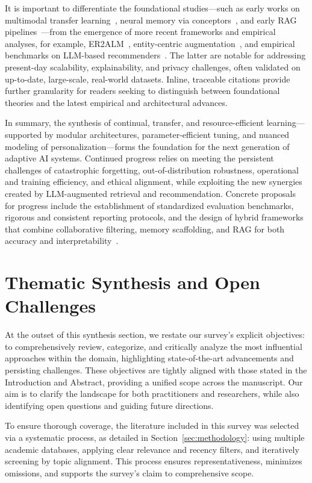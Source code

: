 \documentclass[sigconf]{acmart}
\begin{document}
It is important to differentiate the foundational studies—such as early works on multimodal transfer learning~\cite{ref19}, neural memory via conceptors~\cite{ref23}, and early RAG pipelines~\cite{ref4,ref52}—from the emergence of more recent frameworks and empirical analyses, for example, ER2ALM~\cite{ref11}, entity-centric augmentation~\cite{ref36}, and empirical benchmarks on LLM-based recommenders~\cite{ref32,ref33,ref34}. The latter are notable for addressing present-day scalability, explainability, and privacy challenges, often validated on up-to-date, large-scale, real-world datasets. Inline, traceable citations provide further granularity for readers seeking to distinguish between foundational theories and the latest empirical and architectural advances.

In summary, the synthesis of continual, transfer, and resource-efficient learning—supported by modular architectures, parameter-efficient tuning, and nuanced modeling of personalization—forms the foundation for the next generation of adaptive AI systems. Continued progress relies on meeting the persistent challenges of catastrophic forgetting, out-of-distribution robustness, operational and training efficiency, and ethical alignment, while exploiting the new synergies created by LLM-augmented retrieval and recommendation. Concrete proposals for progress include the establishment of standardized evaluation benchmarks, rigorous and consistent reporting protocols, and the design of hybrid frameworks that combine collaborative filtering, memory scaffolding, and RAG for both accuracy and interpretability~\cite{ref32,ref33,ref34}.

\section{Thematic Synthesis and Open Challenges}

At the outset of this synthesis section, we restate our survey's explicit objectives: to comprehensively review, categorize, and critically analyze the most influential approaches within the domain, highlighting state-of-the-art advancements and persisting challenges. These objectives are tightly aligned with those stated in the Introduction and Abstract, providing a unified scope across the manuscript. Our aim is to clarify the landscape for both practitioners and researchers, while also identifying open questions and guiding future directions.

To ensure thorough coverage, the literature included in this survey was selected via a systematic process, as detailed in Section~\ref{sec:methodology}: using multiple academic databases, applying clear relevance and recency filters, and iteratively screening by topic alignment. This process ensures representativeness, minimizes omissions, and supports the survey's claim to comprehensive scope.
\end{document}
